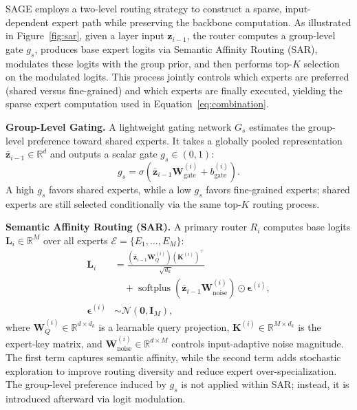 SAGE employs a two-level routing strategy to construct a sparse, input-dependent expert path while preserving the backbone computation. As illustrated in Figure~\ref{fig:sar}, given a layer input $\mathbf{z}_{i-1}$, the router computes a group-level gate $g_s$, produces base expert logits via Semantic Affinity Routing (SAR), modulates these logits with the group prior, and then performs top-$K$ selection on the modulated logits. This process jointly controls which experts are preferred (shared versus fine-grained) and which experts are finally executed, yielding the sparse expert computation used in Equation~\ref{eq:combination}.




\noindent\textbf{Group-Level Gating.}
A lightweight gating network $G_s$ estimates the group-level preference toward shared experts. It takes a globally pooled representation $\bar{\mathbf{z}}_{i-1} \in \mathbb{R}^d$ and outputs a scalar gate $g_s \in (0,1)$:
\begin{equation}
    g_s = \sigma\left(\bar{\mathbf{z}}_{i-1}\mathbf{W}_{\text{gate}}^{(i)} + b_{\text{gate}}^{(i)}\right).
    \label{eq:gate}
\end{equation}
A high $g_s$ favors shared experts, while a low $g_s$ favors fine-grained experts; shared experts are still selected conditionally via the same top-$K$ routing process.


\noindent\textbf{Semantic Affinity Routing (SAR).}
A primary router $R_i$ computes base logits $\mathbf{L}_i \in \mathbb{R}^{M}$ over all experts $\mathcal{E} = \{E_1, \ldots, E_M\}$:
\begin{equation}
\begin{aligned}
\mathbf{L}_i &= \frac{(\bar{\mathbf{z}}_{i-1}\mathbf{W}_{Q}^{(i)})(\mathbf{K}^{(i)})^{\!\top}}{\sqrt{d_k}} \\
&\quad + \operatorname{softplus}(\bar{\mathbf{z}}_{i-1}\mathbf{W}_{\text{noise}}^{(i)}) \odot \boldsymbol{\epsilon}^{(i)}, \\
\boldsymbol{\epsilon}^{(i)} &\sim \mathcal{N}(\mathbf{0}, \mathbf{I}_M),
\end{aligned}
\label{eq:sar_logits}
\end{equation}
where $\mathbf{W}_{Q}^{(i)} \in \mathbb{R}^{d \times d_k}$ is a learnable query projection, $\mathbf{K}^{(i)} \in \mathbb{R}^{M \times d_k}$ is the expert-key matrix, and $\mathbf{W}_{\text{noise}}^{(i)} \in \mathbb{R}^{d \times M}$ controls input-adaptive noise magnitude. The first term captures semantic affinity, while the second term adds stochastic exploration to improve routing diversity and reduce expert over-specialization. The group-level preference induced by $g_s$ is not applied within SAR; instead, it is introduced afterward via logit modulation.

